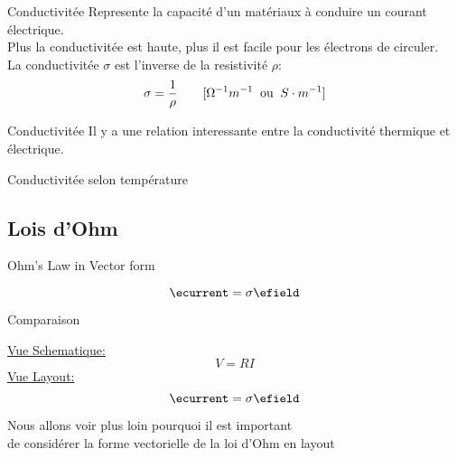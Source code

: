 \begin{frame}{Conductivitée}
    \centering
    \icon[green]{\faExchange*} Represente la capacité d'un matériaux à conduire un courant électrique.\\
    Plus la conductivitée est haute, plus il est facile pour les électrons de circuler.\\
    \vspace{30pt}
    La conductivitée \textbf{$\sigma$} est l'inverse de la resistivité \textbf{$\rho$}:
    \begin{equation}
        \sigma = \frac{1}{\rho} \hspace{2.0em} [\Omega^{-1} m^{-1} \;\;\text{ou}\;\; S\cdot m^{-1}]
    \end{equation}
\end{frame}

\begin{frame}{Conductivitée}
    \centering
    \icon[red]{\faThermometerThreeQuarters} Il y a une relation interessante entre la conductivité thermique et électrique.
\end{frame}

\begin{frame}{Conductivitée selon température}
\end{frame}

\subsection[1min - Max]{Lois d'Ohm}
\begin{frame}{Ohm's Law in Vector form}
        \begin{twocolumns}[0.5]
        \leftcol
        \begin{equation}
            \ecurrent = \sigma \efield
        \end{equation}
        \rightcol
    \end{twocolumns}        
\end{frame}

\begin{frame}{Comparaison}
        \begin{twocolumns}[0.5]
        \leftcol
            \centering
            \underline{Vue Schematique:}
            \begin{equation*}
                V = R I
            \end{equation*}
        \rightcol
            \centering
            \underline{Vue Layout:}
            \begin{equation*}
                \ecurrent = \sigma \efield
            \end{equation*}
    \end{twocolumns}
    \vspace{30pt}
    \centering
    Nous allons voir plus loin pourquoi il est important\\ de considérer la forme vectorielle de la loi d'Ohm en layout
\end{frame}

